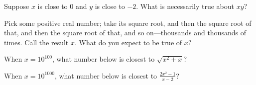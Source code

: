\documentclass{ximera}
\begin{document}
\begin{shuffle}


\begin{problem}
  Suppose $x$ is close to $0$ and $y$ is close to $-2$.  What is necessarily true about $xy$?
  \begin{multipleChoice}
  \end{multipleChoice}
\end{problem}

\begin{problem}
  Pick some positive real number; take its square root, and then the
  square root of that, and then the square root of that, and so
  on---thousands and thousands of times.  Call the result $x$.  What
  do you expect to be true of $x$?
  \begin{multipleChoice}
  \end{multipleChoice}
\end{problem}




\begin{problem}
  When $x = 10^{100}$, what number below is closest to $\sqrt{x^2 + x}$?
  \begin{multipleChoice}
  \end{multipleChoice}
\end{problem}

\begin{problem}
  When $x = 10^{1000}$, what number below is closest to $\frac{2x^2 - 1}{x-2}$? %
  \begin{multipleChoice}
  \end{multipleChoice}
\end{problem}


\end{shuffle}
\end{document}
